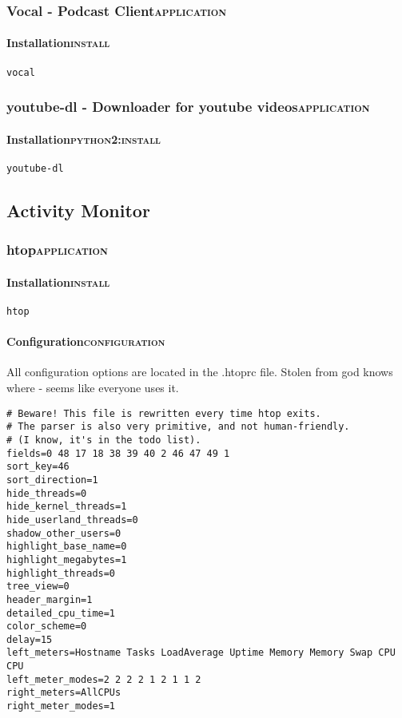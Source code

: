 \documentclass[11pt]{article}
\begin{document}
\subsubsection{Vocal - Podcast Client\hfill{}\textsc{application}}
\label{sec:org0ffcafe}
\paragraph{Installation\hfill{}\textsc{install}}
\label{sec:org0c06d66}
\begin{verbatim}
vocal
\end{verbatim}

\subsubsection{youtube-dl - Downloader for youtube videos\hfill{}\textsc{application}}
\label{sec:org27790fd}
\paragraph{Installation\hfill{}\textsc{python2:install}}
\label{sec:org29beaf3}
\begin{verbatim}
youtube-dl
\end{verbatim}

\subsection{Activity Monitor}
\label{sec:orgcdd8c00}
\subsubsection{htop\hfill{}\textsc{application}}
\label{sec:org42f533c}
\paragraph{Installation\hfill{}\textsc{install}}
\label{sec:org3c5de80}
\begin{verbatim}
htop
\end{verbatim}

\paragraph{Configuration\hfill{}\textsc{configuration}}
\label{sec:org88041e4}
All configuration options are located in the .htoprc file.
Stolen from god knows where - seems like everyone uses it.

\begin{verbatim}
# Beware! This file is rewritten every time htop exits.
# The parser is also very primitive, and not human-friendly.
# (I know, it's in the todo list).
fields=0 48 17 18 38 39 40 2 46 47 49 1
sort_key=46
sort_direction=1
hide_threads=0
hide_kernel_threads=1
hide_userland_threads=0
shadow_other_users=0
highlight_base_name=0
highlight_megabytes=1
highlight_threads=0
tree_view=0
header_margin=1
detailed_cpu_time=1
color_scheme=0
delay=15
left_meters=Hostname Tasks LoadAverage Uptime Memory Memory Swap CPU CPU
left_meter_modes=2 2 2 2 1 2 1 1 2
right_meters=AllCPUs
right_meter_modes=1
\end{verbatim}
\end{document}
